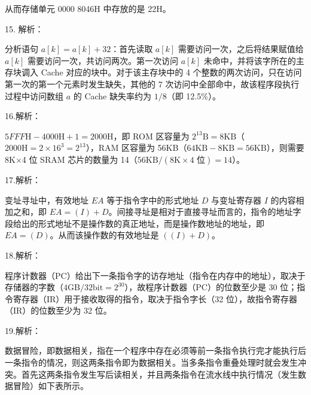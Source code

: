 \documentclass[UTF8,11pt]{ctexart}
\begin{document}
从而存储单元 0000 8046H 中存放的是 22H。


15. 解析：


分析语句 \(\displaystyle a[k]=a[k]+32\)：首先读取 \(\displaystyle a[k]\) 需要访问一次，之后将结果赋值给 \(\displaystyle a[k]\) 需要访问一次，共访问两次。第一次访问 \(\displaystyle a[k]\) 未命中，并将该字所在的主存块调入 Cache 对应的块中。对于该主存块中的 4 个整数的两次访问，只在访问第一次的第一个元素时发生缺失，其他的 7 次访问中全部命中，故该程序段执行过程中访问数组 \(\displaystyle a\) 的 Cache 缺失率约为 \(\displaystyle 1/8\)（即 12.5\%）。


16.解析：


\(\displaystyle 5FFF\mathrm{H}-4000\mathrm{H}+1=2000\mathrm{H}\)，即 ROM 区容量为 \(\displaystyle 2^{13}\mathrm{B}=8\mathrm{KB}\)（\(\displaystyle 2000\mathrm{H}=2\times16^3=2^{13}\)），RAM 区容量为 56KB（\(\displaystyle 64\mathrm{KB}-8\mathrm{KB}=56\mathrm{KB}\)），则需要 8K×4 位 SRAM 芯片的数量为 14（\(\displaystyle 56\mathrm{KB}/(8\mathrm{K}\times4\text{ 位})=14\)）。


17.解析：


变址寻址中，有效地址 \(\displaystyle EA\) 等于指令字中的形式地址 \(\displaystyle D\) 与变址寄存器 \(\displaystyle I\) 的内容相加之和，即 \(\displaystyle EA=(I)+D\)。间接寻址是相对于直接寻址而言的，指令的地址字段给出的形式地址不是操作数的真正地址，而是操作数地址的地址，即 \(\displaystyle EA=(D)\)。从而该操作数的有效地址是 \(\displaystyle ((I)+D)\)。


18.解析：


程序计数器（PC）给出下一条指令字的访存地址（指令在内存中的地址），取决于存储器的字数（\(\displaystyle 4\mathrm{GB}/32\mathrm{bit}=2^{30}\)），故程序计数器（PC）的位数至少是 30 位；指令寄存器（IR）用于接收取得的指令，取决于指令字长（32 位），故指令寄存器（IR）的位数至少为 32 位。


19.解析：


数据冒险，即数据相关，指在一个程序中存在必须等前一条指令执行完才能执行后一条指令的情况，则这两条指令即为数据相关。当多条指令重叠处理时就会发生冲突。首先这两条指令发生写后读相关，并且两条指令在流水线中执行情况（发生数据冒险）如下表所示。
\end{document}
